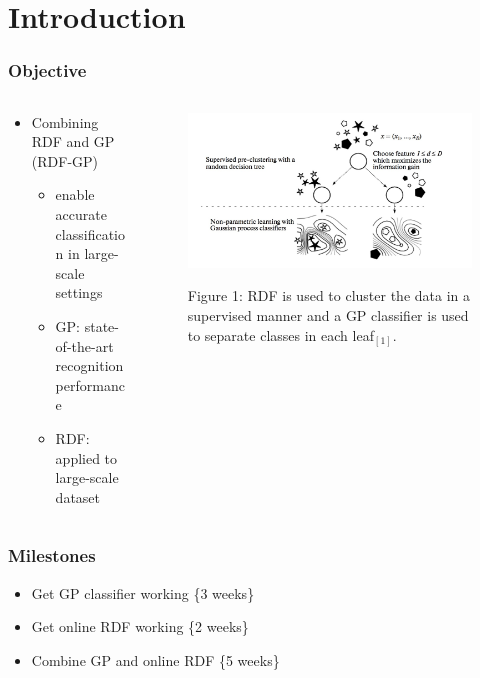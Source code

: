 \documentclass[mathserif]{beamer}
\begin{document}
\section{Introduction}
\begin{frame}
\frametitle{Objective}

\begin{columns}[t]
\begin{column}{0.5\linewidth}
\begin{itemize}
\item Combining RDF and GP (RDF-GP)
\begin{itemize}
\item enable accurate classification in large-scale settings
\item GP: state-of-the-art recognition performance
\item RDF:  applied to large-scale dataset
\end{itemize}
\end{itemize}
\end{column}

\begin{column}{0.5\linewidth}
\begin{figure}[t]
\centering
\includegraphics[width=1.1\linewidth]{fig1}

\scriptsize{Figure 1: RDF is used to cluster the data in a supervised manner and a GP classifier is used to separate classes in each leaf$_{[1]}$.}
\label{fig1}
\end{figure}
\end{column}
\end{columns}

\end{frame}
\begin{frame}
\frametitle{Milestones}

\begin{itemize}
\item Get GP classifier working \{3 weeks\}
\vspace{0.5cm}
\item Get online RDF working \{2 weeks\}
\vspace{0.5cm}
\item Combine GP and online RDF \{5 weeks\}
\end{itemize}

\end{frame}
\end{document}
